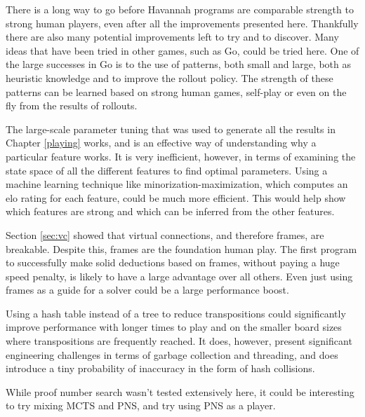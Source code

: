 There is a long way to go before Havannah programs are comparable strength to strong human players, even after all the improvements presented here. Thankfully there are also many potential improvements left to try and to discover. Many ideas that have been tried in other games, such as Go, could be tried here. One of the large successes in Go is to the use of patterns, both small and large, both as heuristic knowledge and to improve the rollout policy. The strength of these patterns can be learned based on strong human games, self-play or even on the fly from the results of rollouts.

The large-scale parameter tuning that was used to generate all the results in Chapter \ref{playing} works, and is an effective way of understanding why a particular feature works. It is very inefficient, however, in terms of examining the state space of all the different features to find optimal parameters. Using a machine learning technique like minorization-maximization\cite{coulom2007computing}, which computes an elo rating for each feature, could be much more efficient. This would help show which features are strong and which can be inferred from the other features.

Section \ref{sec:vc} showed that virtual connections, and therefore frames, are breakable. Despite this, frames are the foundation human play. The first program to successfully make solid deductions based on frames, without paying a huge speed penalty, is likely to have a large advantage over all others. Even just using frames as a guide for a solver could be a large performance boost.

Using a hash table instead of a tree to reduce transpositions could significantly improve performance with longer times to play and on the smaller board sizes where transpositions are frequently reached. It does, however, present significant engineering challenges in terms of garbage collection and threading, and does introduce a tiny probability of inaccuracy in the form of hash collisions.

While proof number search wasn't tested extensively here, it could be interesting to try mixing MCTS and PNS, and try using PNS as a player.

